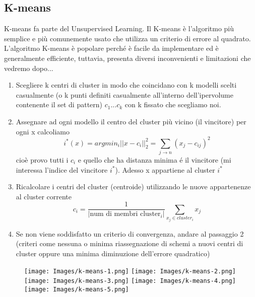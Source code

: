 \documentclass{article}
\begin{document}
\subsection{K-means}
K-means fa parte del Unsupervised Learning. Il K-means è l'algoritmo più semplice e più comunemente usato che utilizza un criterio di errore al quadrato. L'algoritmo K-means è popolare perché è facile da implementare ed è generalmente efficiente, tuttavia, presenta diversi inconvenienti e limitazioni che vedremo dopo...
\begin{enumerate}
    \item Scegliere k centri di cluster in modo che coincidano con k modelli scelti casualmente (o k punti definiti casualmente all'interno dell'ipervolume contenente il set di pattern) \newline
    $c_1...c_k$ con k fissato che scegliamo noi.
    \item Assegnare ad ogni modello il centro del cluster più vicino (il vincitore) \newline
    per ogni x calcoliamo
    \[i^*(x)=argmin_i||x-c_i||^2_2=\sum_{j\rightarrow n}(x_j-c_{ij})^2\]
    cioè provo tutti i $c_i$ e quello che ha distanza minima é il vincitore (mi interessa l'indice del vincitore $i^*$). Adesso x appartiene al cluster $i^*$
    \item Ricalcolare i centri del cluster (centroide) utilizzando le nuove appartenenze al cluster corrente
    \[c_i=\frac{1}{|\text{num di membri cluster}_{i}|}\sum_{x_j \in cluster_i}x_j\]
    \item Se non viene soddisfatto un criterio di convergenza, andare al passaggio 2 (criteri come nessuna o minima riassegnazione di schemi a nuovi centri di cluster oppure una minima diminuzione dell'errore quadratico)
\end{enumerate}
\begin{figure}[H]
\centering
\texttt{[image: Images/k-means-1.png]}
\texttt{[image: Images/k-means-2.png]}
\texttt{[image: Images/k-means-3.png]}
\texttt{[image: Images/k-means-4.png]}
\texttt{[image: Images/k-means-5.png]}
\end{figure}
\end{document}
